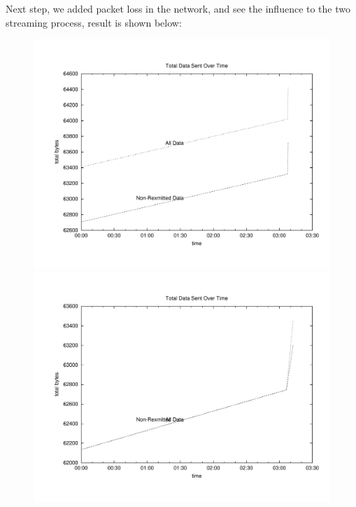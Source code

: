 Next step, we added packet loss in the network, and see the influence to the two
streaming process, result is shown below:
\begin{figure}[H]
\begin{minipage}[b]{0.45\linewidth}
\centering
\includegraphics[width=\textwidth]{charts/AirPlay_traffic_data}
\end{minipage}
\begin{minipage}[b]{0.45\linewidth}
\centering
\includegraphics[width=\textwidth]{charts/AirPlay_traffic_5loss_data}
\end{minipage}
\begin{minipage}[b]{0.45\linewidth}

\end{minipage}
\end{figure}
